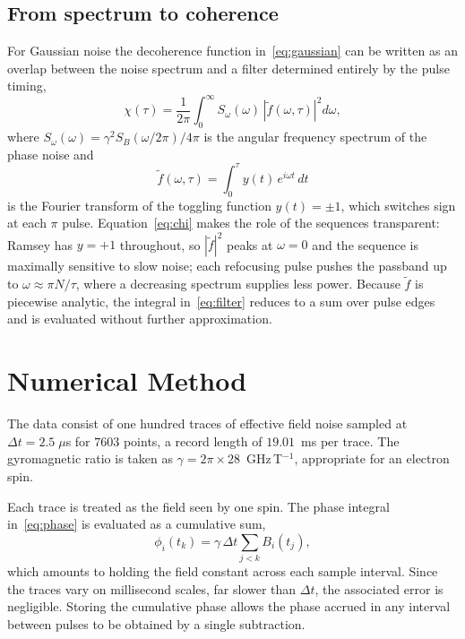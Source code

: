 \documentclass[10pt,twocolumn,a4paper]{article}
\begin{document}
\subsection{From spectrum to coherence}

For Gaussian noise the decoherence function in~\eqref{eq:gaussian} can be written
as an overlap between the noise spectrum and a filter determined entirely by the
pulse timing,
\begin{equation}
\chi(\tau) = \frac{1}{2\pi}\int_0^\infty
S_\omega(\omega)\,\left|\tilde{f}(\omega,\tau)\right|^2 d\omega ,
\label{eq:chi}
\end{equation}
where $S_\omega(\omega) = \gamma^2 S_B(\omega/2\pi)/4\pi$ is the angular frequency
spectrum of the phase noise and
\begin{equation}
\tilde{f}(\omega,\tau) = \int_0^{\tau} y(t)\,e^{i\omega t}\,dt
\label{eq:filter}
\end{equation}
is the Fourier transform of the toggling function $y(t)=\pm 1$, which switches
sign at each $\pi$ pulse. Equation~\eqref{eq:chi} makes the role of the sequences
transparent: Ramsey has $y=+1$ throughout, so $|\tilde{f}|^2$ peaks at
$\omega=0$ and the sequence is maximally sensitive to slow noise; each refocusing
pulse pushes the passband up to $\omega \approx \pi N/\tau$, where a decreasing
spectrum supplies less power. Because $\tilde{f}$ is piecewise analytic, the
integral in~\eqref{eq:filter} reduces to a sum over pulse edges and is evaluated
without further approximation.

\section{Numerical Method}\label{sec:methods}

The data consist of one hundred traces of effective field noise sampled at
$\Delta t = 2.5\;\mu$s for $7603$ points, a record length of $19.01$~ms per trace.
The gyromagnetic ratio is taken as $\gamma = 2\pi \times 28$~GHz\,T$^{-1}$,
appropriate for an electron spin.

Each trace is treated as the field seen by one spin. The phase integral
in~\eqref{eq:phase} is evaluated as a cumulative sum,
\begin{equation}
\phi_i(t_k) = \gamma\,\Delta t \sum_{j<k} B_i(t_j) ,
\end{equation}
which amounts to holding the field constant across each sample interval. Since the
traces vary on millisecond scales, far slower than $\Delta t$, the associated error
is negligible. Storing the cumulative phase allows the phase accrued in any
interval between pulses to be obtained by a single subtraction.
\end{document}
